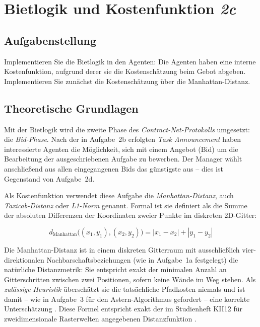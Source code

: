
\section{Bietlogik und Kostenfunktion \textit{2c}}
\label{sec:aufgabe2c}

\subsection{Aufgabenstellung}

Implementieren Sie die Bietlogik in den Agenten: Die Agenten haben eine interne Kostenfunktion, aufgrund derer sie die Kostenschätzung beim Gebot abgeben. Implementieren Sie zunächst die Kostenschätzung über die Manhattan-Distanz.

\subsection{Theoretische Grundlagen}

Mit der Bietlogik wird die zweite Phase des \textit{Contract-Net-Protokolls} umgesetzt: die \textit{Bid-Phase}. Nach der in Aufgabe~2b erfolgten \textit{Task Announcement} haben interessierte Agenten die Möglichkeit, sich mit einem Angebot (Bid) um die Bearbeitung der ausgeschriebenen Aufgabe zu bewerben. Der Manager wählt anschließend aus allen eingegangenen Bids das günstigste aus -- dies ist Gegenstand von Aufgabe~2d.

Als Kostenfunktion verwendet diese Aufgabe die \textit{Manhattan-Distanz}, auch \textit{Taxicab-Distanz} oder \textit{L1-Norm} genannt. Formal ist sie definiert als die Summe der absoluten Differenzen der Koordinaten zweier Punkte im diskreten \acs{2D}-Gitter:

\[
d_{\text{Manhattan}}\bigl((x_1, y_1), (x_2, y_2)\bigr) = |x_1 - x_2| + |y_1 - y_2|
\]

Die Manhattan-Distanz ist in einem diskreten Gitterraum mit ausschließlich vier-direktionalen Nachbarschaftsbeziehungen (wie in Aufgabe~1a festgelegt) die natürliche Distanzmetrik: Sie entspricht exakt der minimalen Anzahl an Gitterschritten zwischen zwei Positionen, sofern keine Wände im Weg stehen. Als \textit{zulässige Heuristik} überschätzt sie die tatsächliche Pfadkosten niemals und ist damit -- wie in Aufgabe~3 für den \acs{Astern}-Algorithmus gefordert -- eine korrekte Unterschätzung \cite[S. 21\,ff.]{5}. Diese Formel entspricht exakt der im Studienheft \acs{KII12} für zweidimensionale Rasterwelten angegebenen Distanzfunktion \cite[Anhang~A, S.~74, Gl.~A.2]{5}.

